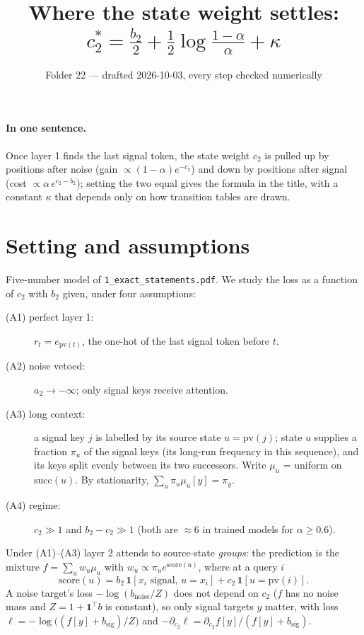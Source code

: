 \documentclass[11pt]{article}
\title{Where the state weight settles:\\ $c_2^\ast = \tfrac{b_2}{2}+\tfrac12\log\tfrac{1-\alpha}{\alpha}+\kappa$}
\author{Folder 22 --- drafted 2026-10-03, every step checked numerically}
\date{}
\theoremstyle{remark}\newtheorem{remark}{Remark}
\newcommand{\1}{\mathbf{1}}
\begin{document}
\maketitle

\paragraph{In one sentence.} Once layer 1 finds the last signal token, the state weight $c_2$ is
pulled up by positions after noise (gain $\propto(1-\alpha)e^{-c_2}$) and down by positions after
signal (cost $\propto\alpha\,e^{c_2-b_2}$); setting the two equal gives the formula in the title,
with a constant $\kappa$ that depends only on how transition tables are drawn.

\section{Setting and assumptions}
Five-number model of \texttt{1\_exact\_statements.pdf}. We study the loss as a function of $c_2$ with $b_2$
given, under four assumptions:
\begin{description}
\item[(A1) perfect layer 1:] $r_t=e_{\mathrm{pv}(t)}$, the one-hot of the last signal token before $t$.
\item[(A2) noise vetoed:] $a_2\to-\infty$; only signal keys receive attention.
\item[(A3) long context:] a signal key $j$ is labelled by its source state $u=\mathrm{pv}(j)$; state $u$
supplies a fraction $\pi_u$ of the signal keys (its long-run frequency in this sequence), and its
keys split evenly between its two successors. Write $\mu_u$ = uniform on $\mathrm{succ}(u)$. By
stationarity, $\sum_u\pi_u\mu_u[y]=\pi_y$.
\item[(A4) regime:] $c_2\gg1$ and $b_2-c_2\gg1$ (both are $\approx6$ in trained models for
$\alpha\ge0.6$).
\end{description}
Under (A1)--(A3) layer 2 attends to source-state \emph{groups}: the prediction is the mixture
$f=\sum_u w_u\mu_u$ with $w_u\propto\pi_u e^{\text{score}(u)}$, where at a query $i$
\[
\text{score}(u)=b_2\,\1[x_i\text{ signal},\,u=x_i]+c_2\,\1[u=\mathrm{pv}(i)].
\]
A noise target's loss $-\log(b_{\mathrm{noise}}/Z)$ does not depend on $c_2$ ($f$ has no noise mass
and $Z=1+\1^\top b$ is constant), so only signal targets $y$ matter, with loss
$\ell=-\log\big((f[y]+b_{\mathrm{sig}})/Z\big)$ and $-\partial_{c_2}\ell=\partial_{c_2}f[y]/(f[y]+b_{\mathrm{sig}})$.
\end{document}
